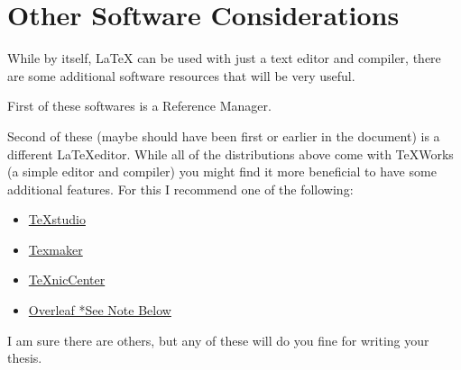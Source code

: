 	\section{Other Software Considerations}
		While by itself, \LaTeX{} can be used with just a text editor and compiler, there are some additional software resources that will be very useful.
		
		First of these softwares is a Reference Manager.
		
		
		Second of these (maybe should have been first or earlier in the document) is a different \LaTeX editor.
		While all of the distributions above come with TeXWorks (a simple editor and compiler) you might find it more beneficial to have some additional features.
		For this I recommend one of the following:
		\begin{itemize}
			\item \href{https://www.texstudio.org/}{TeXstudio}
			\item \href{http://www.xm1math.net/texmaker/}{Texmaker}
			\item \href{http://www.texniccenter.org/}{TeXnicCenter}
			\item \href{https://www.overleaf.com/}{Overleaf *See Note Below}
		\end{itemize}
				I am sure there are others, but any of these will do you fine for writing your thesis.
		
